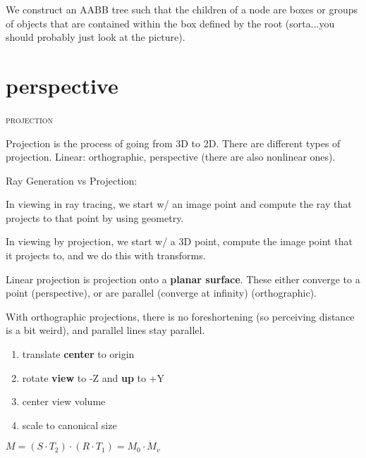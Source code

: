 \documentclass{article}
\begin{document}
We construct an AABB tree such that the children of a node are boxes or groups of objects that are contained within the box defined by the root (sorta...you should probably just look at the picture).
\section{perspective} %
\label{sec:perspective}
\begin{center}\textsc{projection}\end{center} 
Projection is the process of going from 3D to 2D. There are different types of projection. Linear: orthographic, perspective (there are also nonlinear ones).

\vspace{10pt}
Ray Generation vs Projection:

In viewing in ray tracing, we start w/ an image point and compute the ray that projects to that point by using geometry.

In viewing by projection, we start w/ a 3D point, compute the image point that it projects to, and we do this with transforms.

Linear projection is projection onto a {\bf planar surface}. These either converge to a point (perspective), or are parallel (converge at infinity) (orthographic). 

With orthographic projections, there is no foreshortening (so perceiving distance is a bit weird), and parallel lines stay parallel.
\begin{enumerate}
	\item translate \textbf{center} to origin
	\item rotate {\bf view} to -Z and {\bf up} to +Y
	\item center view volume
	\item scale to canonical size
\end{enumerate}
$M=(S\cdot T_2)\cdot(R\cdot T_1) = M_0\cdot M_v$
\vspace{10pt}
\end{document}
